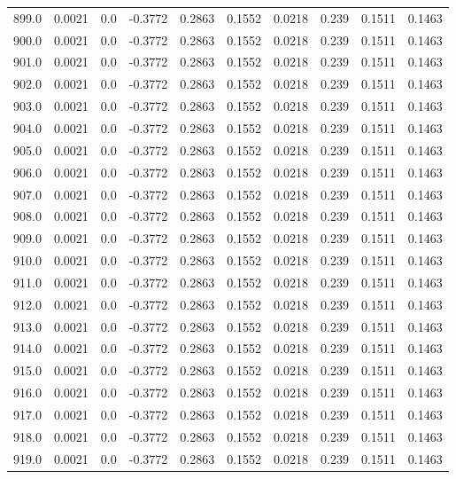 \begin{longtable}{lrrrrrrrrr}
899.0 & 0.0021 & 0.0 & -0.3772 & 0.2863 & 0.1552 & 0.0218 & 0.239 & 0.1511 & 0.1463 \\
900.0 & 0.0021 & 0.0 & -0.3772 & 0.2863 & 0.1552 & 0.0218 & 0.239 & 0.1511 & 0.1463 \\
901.0 & 0.0021 & 0.0 & -0.3772 & 0.2863 & 0.1552 & 0.0218 & 0.239 & 0.1511 & 0.1463 \\
902.0 & 0.0021 & 0.0 & -0.3772 & 0.2863 & 0.1552 & 0.0218 & 0.239 & 0.1511 & 0.1463 \\
903.0 & 0.0021 & 0.0 & -0.3772 & 0.2863 & 0.1552 & 0.0218 & 0.239 & 0.1511 & 0.1463 \\
904.0 & 0.0021 & 0.0 & -0.3772 & 0.2863 & 0.1552 & 0.0218 & 0.239 & 0.1511 & 0.1463 \\
905.0 & 0.0021 & 0.0 & -0.3772 & 0.2863 & 0.1552 & 0.0218 & 0.239 & 0.1511 & 0.1463 \\
906.0 & 0.0021 & 0.0 & -0.3772 & 0.2863 & 0.1552 & 0.0218 & 0.239 & 0.1511 & 0.1463 \\
907.0 & 0.0021 & 0.0 & -0.3772 & 0.2863 & 0.1552 & 0.0218 & 0.239 & 0.1511 & 0.1463 \\
908.0 & 0.0021 & 0.0 & -0.3772 & 0.2863 & 0.1552 & 0.0218 & 0.239 & 0.1511 & 0.1463 \\
909.0 & 0.0021 & 0.0 & -0.3772 & 0.2863 & 0.1552 & 0.0218 & 0.239 & 0.1511 & 0.1463 \\
910.0 & 0.0021 & 0.0 & -0.3772 & 0.2863 & 0.1552 & 0.0218 & 0.239 & 0.1511 & 0.1463 \\
911.0 & 0.0021 & 0.0 & -0.3772 & 0.2863 & 0.1552 & 0.0218 & 0.239 & 0.1511 & 0.1463 \\
912.0 & 0.0021 & 0.0 & -0.3772 & 0.2863 & 0.1552 & 0.0218 & 0.239 & 0.1511 & 0.1463 \\
913.0 & 0.0021 & 0.0 & -0.3772 & 0.2863 & 0.1552 & 0.0218 & 0.239 & 0.1511 & 0.1463 \\
914.0 & 0.0021 & 0.0 & -0.3772 & 0.2863 & 0.1552 & 0.0218 & 0.239 & 0.1511 & 0.1463 \\
915.0 & 0.0021 & 0.0 & -0.3772 & 0.2863 & 0.1552 & 0.0218 & 0.239 & 0.1511 & 0.1463 \\
916.0 & 0.0021 & 0.0 & -0.3772 & 0.2863 & 0.1552 & 0.0218 & 0.239 & 0.1511 & 0.1463 \\
917.0 & 0.0021 & 0.0 & -0.3772 & 0.2863 & 0.1552 & 0.0218 & 0.239 & 0.1511 & 0.1463 \\
918.0 & 0.0021 & 0.0 & -0.3772 & 0.2863 & 0.1552 & 0.0218 & 0.239 & 0.1511 & 0.1463 \\
919.0 & 0.0021 & 0.0 & -0.3772 & 0.2863 & 0.1552 & 0.0218 & 0.239 & 0.1511 & 0.1463 \\

\end{longtable}

